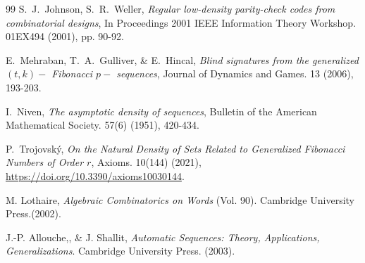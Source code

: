\documentclass[11pt, a4paper]{article}
\theoremstyle{definition}
\begin{document}
\begin{thebibliography}{99}
 S.~J.~Johnson, S.~R.~Weller, \emph{Regular low-density parity-check codes from combinatorial designs}, In Proceedings 2001 IEEE Information Theory Workshop. 01EX494 (2001), pp. 90-92.

 E.~Mehraban, T.~A.~Gulliver, \& E.~Hincal, \emph{Blind signatures from the generalized $(t, k)-$ Fibonacci $ p-$ sequences}, Journal of Dynamics and Games. 13 (2006), 193-203.

 I.~Niven, \emph{The asymptotic density of sequences}, Bulletin of the American Mathematical Society. 57(6) (1951), 420-434.

  P.~Trojovsk\'y, \emph{On the Natural Density of Sets Related to Generalized Fibonacci Numbers of Order $r$}, Axioms. 10(144) (2021), \url{https://doi.org/10.3390/axioms10030144}.




 M. Lothaire, \emph{Algebraic Combinatorics on Words} (Vol. 90). Cambridge University Press.(2002).

 J.-P. Allouche,, \&  J. Shallit, \emph{Automatic Sequences: Theory, Applications, Generalizations}. Cambridge University Press. (2003).

\end{thebibliography}
\end{document}
